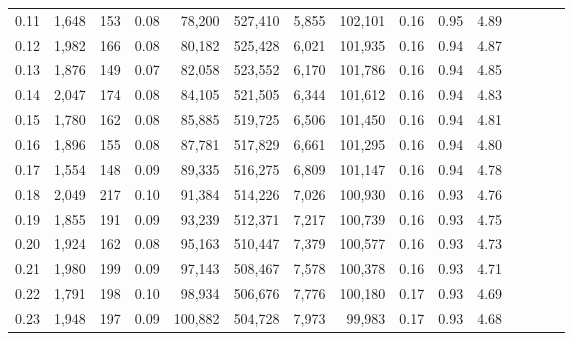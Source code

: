 \begin{tabular}{rrrcrrrrrrrrrrr}
0.11 &   1,648 &     153 &                                       0.08 &   78,200 &  527,410 &    5,855 &  102,101 &  0.16 &  0.95 &                         4.89 \\
0.12 &   1,982 &     166 &                                       0.08 &   80,182 &  525,428 &    6,021 &  101,935 &  0.16 &  0.94 &                         4.87 \\
0.13 &   1,876 &     149 &                                       0.07 &   82,058 &  523,552 &    6,170 &  101,786 &  0.16 &  0.94 &                         4.85 \\
0.14 &   2,047 &     174 &                                       0.08 &   84,105 &  521,505 &    6,344 &  101,612 &  0.16 &  0.94 &                         4.83 \\
0.15 &   1,780 &     162 &                                       0.08 &   85,885 &  519,725 &    6,506 &  101,450 &  0.16 &  0.94 &                         4.81 \\
0.16 &   1,896 &     155 &                                       0.08 &   87,781 &  517,829 &    6,661 &  101,295 &  0.16 &  0.94 &                         4.80 \\
0.17 &   1,554 &     148 &                                       0.09 &   89,335 &  516,275 &    6,809 &  101,147 &  0.16 &  0.94 &                         4.78 \\
0.18 &   2,049 &     217 &                                       0.10 &   91,384 &  514,226 &    7,026 &  100,930 &  0.16 &  0.93 &                         4.76 \\
0.19 &   1,855 &     191 &                                       0.09 &   93,239 &  512,371 &    7,217 &  100,739 &  0.16 &  0.93 &                         4.75 \\
0.20 &   1,924 &     162 &                                       0.08 &   95,163 &  510,447 &    7,379 &  100,577 &  0.16 &  0.93 &                         4.73 \\
0.21 &   1,980 &     199 &                                       0.09 &   97,143 &  508,467 &    7,578 &  100,378 &  0.16 &  0.93 &                         4.71 \\
0.22 &   1,791 &     198 &                                       0.10 &   98,934 &  506,676 &    7,776 &  100,180 &  0.17 &  0.93 &                         4.69 \\
0.23 &   1,948 &     197 &                                       0.09 &  100,882 &  504,728 &    7,973 &   99,983 &  0.17 &  0.93 &                         4.68 \\

\end{tabular}
